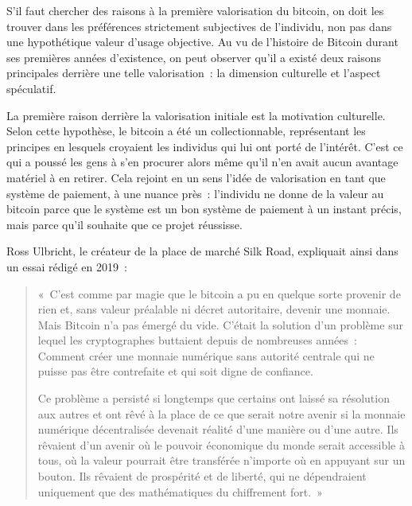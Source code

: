 
S'il faut chercher des raisons à la première valorisation du bitcoin, on doit les trouver dans les préférences strictement subjectives de l'individu, non pas dans une hypothétique valeur d'usage objective. Au vu de l'histoire de Bitcoin durant ses premières années d'existence, on peut observer qu'il a existé deux raisons principales derrière une telle valorisation~: la dimension culturelle et l'aspect spéculatif.

La première raison derrière la valorisation initiale est la motivation culturelle. Selon cette hypothèse, le bitcoin a été un collectionnable, représentant les principes en lesquels croyaient les individus qui lui ont porté de l'intérêt. C'est ce qui a poussé les gens à s'en procurer alors même qu'il n'en avait aucun avantage matériel à en retirer. Cela rejoint en un sens l'idée de valorisation en tant que système de paiement, à une nuance près~: l'individu ne donne de la valeur au bitcoin parce que le système est un bon système de paiement à un instant précis, mais parce qu'il souhaite que ce projet réussisse.

Ross Ulbricht, le créateur de la place de marché Silk Road, expliquait ainsi dans un essai rédigé en 2019~:

\begin{quote}
«~C'est comme par magie que le bitcoin a pu en quelque sorte provenir de rien et, sans valeur préalable ni décret autoritaire, devenir une monnaie. Mais Bitcoin n'a pas émergé du vide. C'était la solution d'un problème sur lequel les cryptographes buttaient depuis de nombreuses années~: Comment créer une monnaie numérique sans autorité centrale qui ne puisse pas être contrefaite et qui soit digne de confiance.

Ce problème a persisté si longtemps que certains ont laissé sa résolution aux autres et ont rêvé à la place de ce que serait notre avenir si la monnaie numérique décentralisée devenait réalité d'une manière ou d'une autre. Ils rêvaient d'un avenir où le pouvoir économique du monde serait accessible à tous, où la valeur pourrait être transférée n'importe où en appuyant sur un bouton. Ils rêvaient de prospérité et de liberté, qui ne dépendraient uniquement que des mathématiques du chiffrement fort.~»
\end{quote}

